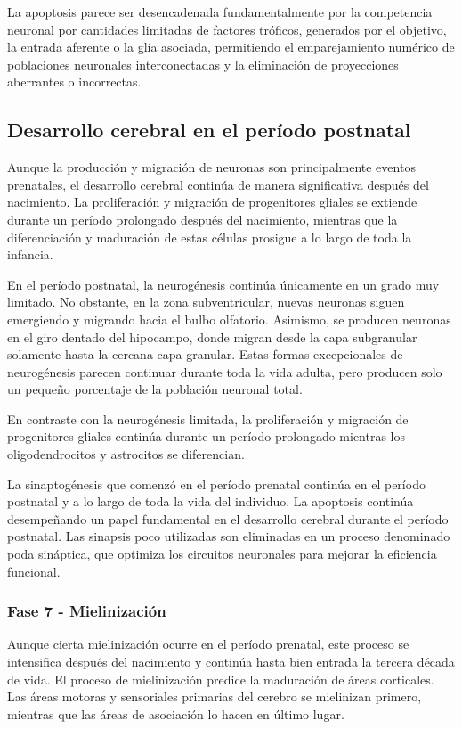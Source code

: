 \documentclass[11pt,letterpaper]{report}
\begin{document}
La apoptosis parece ser desencadenada fundamentalmente por la competencia
neuronal por cantidades limitadas de factores tróficos, generados por el
objetivo, la entrada aferente o la glía asociada, permitiendo el emparejamiento
numérico de poblaciones neuronales interconectadas y la eliminación de
proyecciones aberrantes o incorrectas. \cite{Polin124}

\subsection{Desarrollo cerebral en el período postnatal}
Aunque la producción y migración de neuronas son principalmente eventos
prenatales, el desarrollo cerebral continúa de manera significativa después del
nacimiento. La proliferación y migración de progenitores gliales se extiende
durante un período prolongado después del nacimiento, mientras que la
diferenciación y maduración de estas células prosigue a lo largo de toda la
infancia. \cite{Stiles2010}

En el período postnatal, la neurogénesis continúa únicamente en un grado muy
limitado. No obstante, en la zona subventricular, nuevas neuronas siguen
emergiendo y migrando hacia el bulbo olfatorio. Asimismo, se producen neuronas
en el giro dentado del hipocampo, donde migran desde la capa subgranular
solamente hasta la cercana capa granular. Estas formas excepcionales de
neurogénesis parecen continuar durante toda la vida adulta, pero producen solo
un pequeño porcentaje de la población neuronal total.
\cite{Stiles2010}

En contraste con la neurogénesis limitada, la proliferación y migración de
progenitores gliales continúa durante un período prolongado mientras los
oligodendrocitos y astrocitos se diferencian. \cite{Stiles2010}

La sinaptogénesis que comenzó en el período prenatal continúa en el período
postnatal y a lo largo de toda la vida del individuo. La apoptosis continúa
desempeñando un papel fundamental en el desarrollo cerebral durante el período
postnatal. Las sinapsis poco utilizadas son eliminadas en un proceso denominado
poda sináptica, que optimiza los circuitos neuronales para mejorar la
eficiencia funcional. \cite{Gibb2018}

\subsubsection{Fase 7 - Mielinización}
Aunque cierta mielinización ocurre en el período prenatal, este proceso se
intensifica después del nacimiento y continúa hasta bien entrada la tercera
década de vida. El proceso de mielinización predice la maduración de áreas
corticales. Las áreas motoras y sensoriales primarias del cerebro se mielinizan
primero, mientras que las áreas de asociación lo hacen en último lugar.
\cite{Gibb2018}
\end{document}
